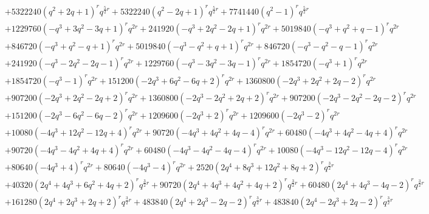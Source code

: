 \documentclass[11pt,english]{amsart}
\numberwithin{equation}{section}
\numberwithin{figure}{section}
\theoremstyle{plain}
\theoremstyle{plain}
\theoremstyle{definition}
\theoremstyle{remark}
\begin{document}
{\begin{align*}
& + 5322240 {\left(q^{2} + 2 q + 1\right)}^{r} q^{\frac{5}{2} r} + 5322240 {\left(q^{2} - 2 q + 1\right)}^{r} q^{\frac{5}{2} r} + 7741440 {\left(q^{2} - 1\right)}^{r} q^{\frac{5}{2} r} \\
& + 1229760 {\left(-q^{3} + 3 q^{2} - 3 q + 1\right)}^{r} q^{2 r} + 241920 {\left(-q^{3} + 2 q^{2} - 2 q + 1\right)}^{r} q^{2 r} + 5019840 {\left(-q^{3} + q^{2} + q - 1\right)}^{r} q^{2 r} \\
& + 846720 {\left(-q^{3} + q^{2} - q + 1\right)}^{r} q^{2 r} + 5019840 {\left(-q^{3} - q^{2} + q + 1\right)}^{r} q^{2 r} + 846720 {\left(-q^{3} - q^{2} - q - 1\right)}^{r} q^{2 r} \\
& + 241920 {\left(-q^{3} - 2 q^{2} - 2 q - 1\right)}^{r} q^{2 r} + 1229760 {\left(-q^{3} - 3 q^{2} - 3 q - 1\right)}^{r} q^{2 r} + 1854720 {\left(-q^{3} + 1\right)}^{r} q^{2 r} \\
& + 1854720 {\left(-q^{3} - 1\right)}^{r} q^{2 r} + 151200 {\left(-2 q^{3} + 6 q^{2} - 6 q + 2\right)}^{r} q^{2 r} + 1360800 {\left(-2 q^{3} + 2 q^{2} + 2 q - 2\right)}^{r} q^{2 r} \\
& + 907200 {\left(-2 q^{3} + 2 q^{2} - 2 q + 2\right)}^{r} q^{2 r} + 1360800 {\left(-2 q^{3} - 2 q^{2} + 2 q + 2\right)}^{r} q^{2 r} + 907200 {\left(-2 q^{3} - 2 q^{2} - 2 q - 2\right)}^{r} q^{2 r} \\
& + 151200 {\left(-2 q^{3} - 6 q^{2} - 6 q - 2\right)}^{r} q^{2 r} + 1209600 {\left(-2 q^{3} + 2\right)}^{r} q^{2 r} + 1209600 {\left(-2 q^{3} - 2\right)}^{r} q^{2 r} \\
& + 10080 {\left(-4 q^{3} + 12 q^{2} - 12 q + 4\right)}^{r} q^{2 r} + 90720 {\left(-4 q^{3} + 4 q^{2} + 4 q - 4\right)}^{r} q^{2 r} + 60480 {\left(-4 q^{3} + 4 q^{2} - 4 q + 4\right)}^{r} q^{2 r} \\
& + 90720 {\left(-4 q^{3} - 4 q^{2} + 4 q + 4\right)}^{r} q^{2 r} + 60480 {\left(-4 q^{3} - 4 q^{2} - 4 q - 4\right)}^{r} q^{2 r} + 10080 {\left(-4 q^{3} - 12 q^{2} - 12 q - 4\right)}^{r} q^{2 r} \\
& + 80640 {\left(-4 q^{3} + 4\right)}^{r} q^{2 r} + 80640 {\left(-4 q^{3} - 4\right)}^{r} q^{2 r} + 2520 {\left(2 q^{4} + 8 q^{3} + 12 q^{2} + 8 q + 2\right)}^{r} q^{\frac{3}{2} r} \\
& + 40320 {\left(2 q^{4} + 4 q^{3} + 6 q^{2} + 4 q + 2\right)}^{r} q^{\frac{3}{2} r} + 90720 {\left(2 q^{4} + 4 q^{3} + 4 q^{2} + 4 q + 2\right)}^{r} q^{\frac{3}{2} r} + 60480 {\left(2 q^{4} + 4 q^{3} - 4 q - 2\right)}^{r} q^{\frac{3}{2} r} \\
& + 161280 {\left(2 q^{4} + 2 q^{3} + 2 q + 2\right)}^{r} q^{\frac{3}{2} r} + 483840 {\left(2 q^{4} + 2 q^{3} - 2 q - 2\right)}^{r} q^{\frac{3}{2} r} + 483840 {\left(2 q^{4} - 2 q^{3} + 2 q - 2\right)}^{r} q^{\frac{3}{2} r} \\

\end{align*}}
\end{document}
